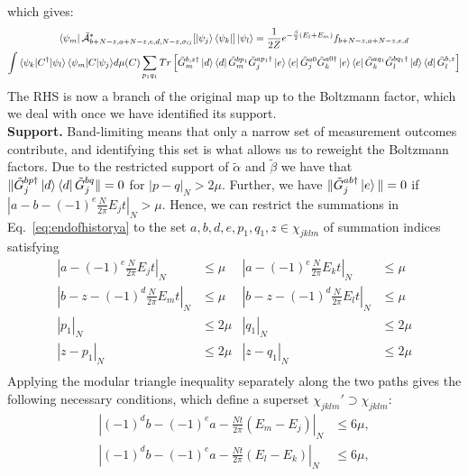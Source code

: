 which gives:
\begin{multline}
 \bra{\psi_m}\tilde{\mathcal{A}}^*_{b+N-z,a+N-z,e,d,N-z,\sigma_G}[\ket{\psi_j}\bra{\psi_k}]\ket{\psi_l}  = \frac{1}{2Z} e^{-\frac{\beta}{2}(E_l+E_m)}{f_{b+N-z,a+N-z,e,d}} \\\int {\braket{\psi_k|C^{\dagger}|\psi_l}\braket{\psi_m|C|\psi_j}} d\mu(C)\sum_{p_1q_1} Tr\left[ {\tilde G_m^{b, z\dagger}\ket{d}\bra{d}\tilde G_m^{bp_1}} {\tilde G^{ap_1\dagger}_j\ket{e}\bra{e}\tilde G^{a0}_j } \tilde G^{a0\dagger}_k\ket{e}\bra{e}\tilde G^{aq_1}_k \tilde G_l^{bq_1\dagger}\ket{d}\bra{d}\tilde G_l^{b,z}\right]
 \label{eq:endofhistorya}
\end{multline}
The RHS is now a branch of the original map up to the Boltzmann factor, which we deal with once we have identified its support.\\
\textbf{Support.} Band-limiting means that only a narrow set of measurement outcomes contribute, and identifying this set is what allows us to reweight the Boltzmann factors. Due to the restricted support of $\tilde \alpha$ and $\tilde \beta$ we have that $\|\tilde G^{bp\dagger}_{j}\ket{d}\bra{d}\tilde G^{bq}_{j}\| = 0$ for $|p-q|_{N} > 2\mu$. Further, we have $\|\tilde G^{ab \dagger}_j \ket{e}\| = 0$ if $|a-b-(-1)^e\frac{N}{2\pi}E_{j}t|_{N} > \mu$. Hence, we can restrict the summations in Eq.~\eqref{eq:endofhistorya}  to the set $a,b,d,e,p_1,q_1,z \in \chi_{jklm}$ of summation indices satisfying
\begin{equation}
\begin{aligned}
    |a-(-1)^e\frac{N}{2\pi}E_jt|_{N} &\leq \mu  &|a-(-1)^e\frac{N}{2\pi}E_kt|_{N} &\leq \mu\\
       |b-z-(-1)^{d}\frac{N}{2\pi}E_mt|_{N}& \leq \mu&|b-z-(-1)^{d}\frac{N}{2\pi}E_lt|_{N} &\leq \mu \\
    |p_1|_{N}&\leq 2\mu&  |q_1|_{N}&\leq 2\mu \\
    |z-p_1|_{N}&\leq 2\mu&  |z-q_1|_{N}&\leq 2\mu \\
\end{aligned}
\label{eq:conds}
\end{equation}
Applying the modular triangle inequality separately along the two paths gives the following necessary conditions, which define a superset $\chi_{jklm}'\supset\chi_{jklm}$:
\begin{equation}
\label{eq:condJ}
\begin{aligned}
    \left|(-1)^db -(-1)^ea-\frac{Nt}{2\pi}(E_m-E_j)\right|_{N}&\leq 6\mu,\\
    \left|(-1)^db -(-1)^ea-\frac{Nt}{2\pi}(E_l-E_k)\right|_{N}&\leq 6\mu,
\end{aligned}
\end{equation}

